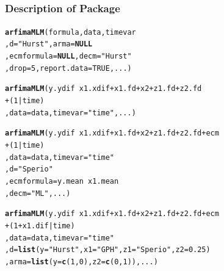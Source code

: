 \documentclass{beamer}\usepackage[]{graphicx}\usepackage[]{color}
\makeatletter
\newcommand{\hlnum}[1]{\textcolor[rgb]{0.686,0.059,0.569}{#1}}%
\newcommand{\hlstr}[1]{\textcolor[rgb]{0.192,0.494,0.8}{#1}}%
\newcommand{\hlopt}[1]{\textcolor[rgb]{0,0,0}{#1}}%
\newcommand{\hlstd}[1]{\textcolor[rgb]{0.345,0.345,0.345}{#1}}%
\newcommand{\hlkwa}[1]{\textcolor[rgb]{0.161,0.373,0.58}{\textbf{#1}}}%
\newcommand{\hlkwc}[1]{\textcolor[rgb]{0.333,0.667,0.333}{#1}}%
\newcommand{\hlkwd}[1]{\textcolor[rgb]{0.737,0.353,0.396}{\textbf{#1}}}%
\newenvironment{kframe}{%
 \def\at@end@of@kframe{}%
 \ifinner\ifhmode%
  \def\at@end@of@kframe{\end{minipage}}%
  \begin{minipage}{\columnwidth}%
 \fi\fi%
 \def\FrameCommand##1{\hskip\@totalleftmargin \hskip-\fboxsep
 \colorbox{shadecolor}{##1}\hskip-\fboxsep
     \hskip-\linewidth \hskip-\@totalleftmargin \hskip\columnwidth}%
 \MakeFramed {\advance\hsize-\width
   \@totalleftmargin\z@ \linewidth\hsize
   \@setminipage}}%
 {\par\unskip\endMakeFramed%
 \at@end@of@kframe}
\newenvironment{knitrout}{}{} %
\makeatother
\begin{document}
\subsection{}
\begin{frame}[fragile]\scriptsize%
\frametitle{Description of Package}
\begin{knitrout}
\color{fgcolor}\begin{kframe}
\begin{alltt}
\hlkwd{arfimaMLM}\hlstd{(formula, data, timevar}
          \hlstd{,} \hlkwc{d} \hlstd{=} \hlstr{"Hurst"}\hlstd{,} \hlkwc{arma} \hlstd{=} \hlkwa{NULL}
          \hlstd{,} \hlkwc{ecmformula} \hlstd{=} \hlkwa{NULL}\hlstd{,} \hlkwc{decm} \hlstd{=} \hlstr{"Hurst"}
          \hlstd{,} \hlkwc{drop} \hlstd{=} \hlnum{5}\hlstd{,} \hlkwc{report.data} \hlstd{=} \hlnum{TRUE}\hlstd{, ...)}

\hlkwd{arfimaMLM}\hlstd{(y.ydif} \hlopt{~} \hlstd{x1.xdif} \hlopt{+} \hlstd{x1.fd} \hlopt{+} \hlstd{x2} \hlopt{+} \hlstd{z1.fd} \hlopt{+} \hlstd{z2.fd}
          \hlopt{+} \hlstd{(}\hlnum{1} \hlopt{|} \hlstd{time)}
          \hlstd{,} \hlkwc{data} \hlstd{= data,} \hlkwc{timevar} \hlstd{=} \hlstr{"time"}\hlstd{, ...)}

\hlkwd{arfimaMLM}\hlstd{(y.ydif} \hlopt{~} \hlstd{x1.xdif} \hlopt{+} \hlstd{x1.fd} \hlopt{+} \hlstd{x2} \hlopt{+} \hlstd{z1.fd} \hlopt{+} \hlstd{z2.fd} \hlopt{+} \hlstd{ecm}
          \hlopt{+} \hlstd{(}\hlnum{1} \hlopt{|} \hlstd{time)}
          \hlstd{,} \hlkwc{data} \hlstd{= data,} \hlkwc{timevar} \hlstd{=} \hlstr{"time"}
          \hlstd{,} \hlkwc{d} \hlstd{=} \hlstr{"Sperio"}
          \hlstd{,} \hlkwc{ecmformula} \hlstd{= y.mean} \hlopt{~} \hlstd{x1.mean}
          \hlstd{,} \hlkwc{decm} \hlstd{=} \hlstr{"ML"}\hlstd{, ...)}

\hlkwd{arfimaMLM}\hlstd{(y.ydif} \hlopt{~} \hlstd{x1.xdif} \hlopt{+} \hlstd{x1.fd} \hlopt{+} \hlstd{x2} \hlopt{+} \hlstd{z1.fd} \hlopt{+} \hlstd{z2.fd} \hlopt{+} \hlstd{ecm}
          \hlopt{+} \hlstd{(}\hlnum{1} \hlopt{+} \hlstd{x1.dif} \hlopt{|} \hlstd{time)}
          \hlstd{,} \hlkwc{data} \hlstd{= data,} \hlkwc{timevar} \hlstd{=} \hlstr{"time"}
          \hlstd{,} \hlkwc{d} \hlstd{=} \hlkwd{list}\hlstd{(}\hlkwc{y} \hlstd{=} \hlstr{"Hurst"}\hlstd{,} \hlkwc{x1} \hlstd{=} \hlstr{"GPH"}\hlstd{,} \hlkwc{z1} \hlstd{=} \hlstr{"Sperio"}\hlstd{,} \hlkwc{z2} \hlstd{=} \hlnum{0.25}\hlstd{)}
          \hlstd{,} \hlkwc{arma} \hlstd{=} \hlkwd{list}\hlstd{(}\hlkwc{y} \hlstd{=} \hlkwd{c}\hlstd{(}\hlnum{1}\hlstd{,}\hlnum{0}\hlstd{),} \hlkwc{z2} \hlstd{=} \hlkwd{c}\hlstd{(}\hlnum{0}\hlstd{,}\hlnum{1}\hlstd{)), ...)}
\end{alltt}
\end{kframe}
\end{knitrout}
\end{frame}
\end{document}
